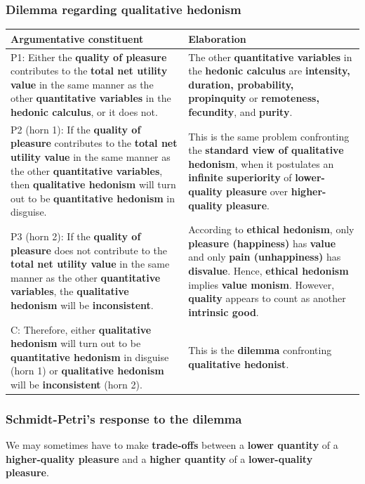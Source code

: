 \documentclass[11pt]{article}
\begin{document}
\subsubsection{Dilemma regarding qualitative hedonism}
\label{sec:org1399493}
\begin{center}
\begin{tabularx}{\textwidth}{|X|X|}
\hline
Argumentative constituent & Elaboration\\
\hline
P1: Either the \textbf{quality of pleasure} contributes to the \textbf{total net utility value} in the same manner as the other \textbf{quantitative variables} in the \textbf{hedonic calculus}, or it does not. & The other \textbf{quantitative variables} in the \textbf{hedonic calculus} are \textbf{intensity, duration, probability, propinquity} or \textbf{remoteness, fecundity}, and \textbf{purity}.\\
\hline
P2 (horn 1): If the \textbf{quality of pleasure} contributes to the \textbf{total net utility value} in the same manner as the other \textbf{quantitative variables}, then \textbf{qualitative hedonism} will turn out to be \textbf{quantitative hedonism} in disguise. & This is the same problem confronting the \textbf{standard view of qualitative hedonism}, when it postulates an \textbf{infinite superiority} of \textbf{lower-quality pleasure} over \textbf{higher-quality pleasure}.\\
P3 (horn 2): If the \textbf{quality of pleasure} does not contribute to the \textbf{total net utility value} in the same manner as the other \textbf{quantitative variables}, the \textbf{qualitative hedonism} will be \textbf{inconsistent}. & According to \textbf{ethical hedonism}, only \textbf{pleasure (happiness)} has \textbf{value} and only \textbf{pain (unhappiness)} has \textbf{disvalue}. Hence, \textbf{ethical hedonism} implies \textbf{value monism}. However, \textbf{quality} appears to count as another \textbf{intrinsic good}.\\
\hline
C: Therefore, either \textbf{qualitative hedonism} will turn out to be \textbf{quantitative hedonism} in disguise (horn 1) or \textbf{qualitative hedonism} will be \textbf{inconsistent} (horn 2). & This is the \textbf{dilemma} confronting \textbf{qualitative hedonist}.\\
\hline
\end{tabularx}
\end{center}

 \newpage
\subsubsection{Schmidt-Petri's response to the dilemma}
\label{sec:orga625760}
We may sometimes have to make \textbf{trade-offs} between a \textbf{lower quantity} of a \textbf{higher-quality pleasure} and a \textbf{higher quantity} of a \textbf{lower-quality pleasure}.
\end{document}
